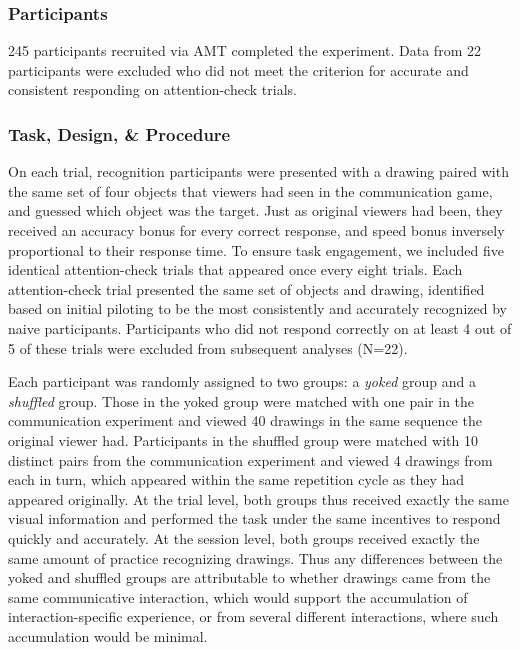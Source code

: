 \documentclass[10pt,letterpaper]{article}
\begin{document}
\subsubsection{Participants}

245 participants recruited via AMT completed the experiment. Data from 22 participants were excluded who did not meet the criterion for accurate and consistent responding on attention-check trials.

\subsubsection{Task, Design, \& Procedure}

On each trial, recognition participants were presented with a drawing paired with the same set of four objects that viewers had seen in the communication game, and guessed which object was the target.
Just as original viewers had been, they received an accuracy bonus for every correct response, and speed bonus inversely proportional to their response time.
To ensure task engagement, we included five identical attention-check trials that appeared once every eight trials.
Each attention-check trial presented the same set of objects and drawing, identified based on initial piloting to be the most consistently and accurately recognized by naive participants.
Participants who did not respond correctly on at least 4 out of 5 of these trials were excluded from subsequent analyses (N=22).

Each participant was randomly assigned to two groups: a \textit{yoked} group and a \textit{shuffled} group.
Those in the yoked group were matched with one pair in the communication experiment and viewed 40 drawings in the same sequence the original viewer had.
Participants in the shuffled group were matched with 10 distinct pairs from the communication experiment and viewed 4 drawings from each in turn, which appeared within the same repetition cycle as they had appeared originally.
At the trial level, both groups thus received exactly the same visual information and performed the task under the same incentives to respond quickly and accurately.
At the session level, both groups received exactly the same amount of practice recognizing drawings.
Thus any differences between the yoked and shuffled groups are attributable to whether drawings came from the same communicative interaction, which would support the accumulation of interaction-specific experience, or from several different interactions, where such accumulation would be minimal.
\end{document}
